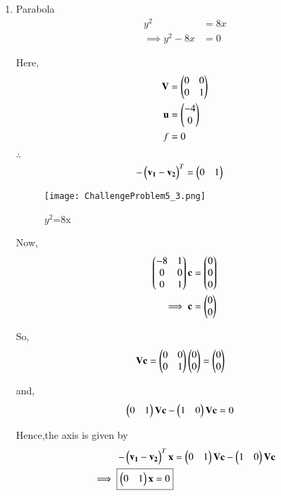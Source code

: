 \documentclass[journal,12pt,twocolumn]{IEEEtran}
\begin{document}
\begin{enumerate}
    \item Parabola
    \begin{align}
        y^2 &= 8x
        \\
        \implies y^2-8x &= 0
    \end{align}
    
    Here,
    \begin{align}
    \mathbf{V} &= \begin{pmatrix}0 & 0 \\ 0 & 1\end{pmatrix} \\
    \mathbf{u} &= \begin{pmatrix}-4 \\ 0\end{pmatrix} \\
    f &= 0
    \end{align}

    $\therefore$
    \begin{align}
    -\begin{pmatrix}\mathbf{v_1}-\mathbf{v_2}\end{pmatrix}^T &= \begin{pmatrix}0 & 1\end{pmatrix}
    \end{align}
    
    \begin{figure}[!ht]
    \centering
    \texttt{[image: ChallengeProblem5\_3.png]}
    \caption{$y^2$=8x}
    \label{ex3}	
    \end{figure}

    Now,
    \begin{align}
    \begin{pmatrix}-8 & 1 \\ 0 & 0 \\ 0 & 1\end{pmatrix}\mathbf{c} &= \begin{pmatrix}0 \\ 0 \\ 0\end{pmatrix}
    \\
    \implies \mathbf{c} &= \begin{pmatrix}0 \\ 0\end{pmatrix}
    \end{align}

    So,
    \begin{align}
    \mathbf{V}\mathbf{c} &= \begin{pmatrix}0 & 0 \\ 0 & 1\end{pmatrix}\begin{pmatrix}0 \\ 0\end{pmatrix}=\begin{pmatrix}0 \\ 0\end{pmatrix}
    \end{align}

    and,
    \begin{align}
    \begin{pmatrix}0 & 1\end{pmatrix}\mathbf{V}\mathbf{c} - \begin{pmatrix}1&0\end{pmatrix}\mathbf{V}\mathbf{c} &= 0
    \end{align}

    Hence,the axis is given by
    \begin{align}
    -\begin{pmatrix}\mathbf{v_1}-\mathbf{v_2}\end{pmatrix}^T\mathbf{x} &= \begin{pmatrix}0 & 1\end{pmatrix}\mathbf{V}\mathbf{c} - \begin{pmatrix}1 & 0\end{pmatrix}\mathbf{V}\mathbf{c} \\
    \implies \boxed{\begin{pmatrix}0 & 1\end{pmatrix}\mathbf{x} = 0}
    \end{align}
    

\end{enumerate}
\end{document}

